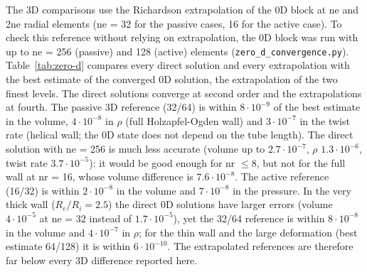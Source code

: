 The 3D comparisons use the Richardson extrapolation of the 0D block at ne and 2ne radial
elements (ne = 32 for the passive cases, 16 for the active case). To check this reference
without relying on extrapolation, the 0D block was run with up to ne = 256 (passive) and
128 (active) elements (\texttt{zero\_d\_convergence.py}). Table~\ref{tab:zero-d} compares every
direct solution and every extrapolation with the best estimate of the converged 0D
solution, the extrapolation of the two finest levels. The direct solutions converge at
second order and the extrapolations at fourth. The passive 3D reference (32/64) is within
$8\cdot10^{-9}$ of the best estimate in the volume, $4\cdot10^{-8}$ in $\rho$ (full
Holzapfel-Ogden wall) and $3\cdot10^{-7}$ in the twist rate (helical wall; the 0D state does
not depend on the tube length). The direct
solution with ne = 256 is much less accurate (volume up to $2.7\cdot10^{-7}$, $\rho$
$1.3\cdot10^{-6}$, twist rate $3.7\cdot10^{-5}$): it would be good enough for nr $\le 8$, but
not for the full wall at nr = 16, whose volume difference is $7.6\cdot10^{-8}$. The
active reference (16/32) is within $2\cdot10^{-8}$ in the volume and $7\cdot10^{-8}$ in the
pressure. In the very thick wall ($R_e/R_i = 2.5$) the direct 0D solutions have larger
errors (volume $4\cdot10^{-5}$ at ne = 32 instead of $1.7\cdot10^{-5}$), yet the 32/64 reference is
within $8\cdot10^{-8}$ in the volume and $4\cdot10^{-7}$ in $\rho$; for the thin wall and the
large deformation (best estimate 64/128) it is within $6\cdot10^{-10}$. The extrapolated
references are therefore far below every 3D difference reported here.
